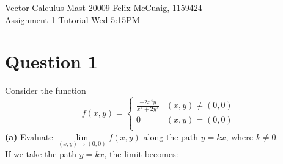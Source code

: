 \documentclass[12pt]{article}
\begin{document}
Vector Calculus Mast 20009 \hfill Felix McCuaig, 1159424 \\
Assignment 1 \hfill Tutorial Wed 5:15PM  

\section*{Question 1}
Consider the function
$$
f(x,y)=
\begin{cases} 
      \frac{-2x^4y}{x^4+2y^2} & (x,y) \neq (0,0) \\
      0 & (x,y)=(0,0) \\
\end{cases}
$$
\textbf{(a)} Evaluate $\lim\limits_{(x,y) \rightarrow (0,0)}f(x,y)$ along the path $y=kx$, where $k \neq 0$.\\
\medskip
If we take the path $y=kx$, the limit becomes:
\end{document}
